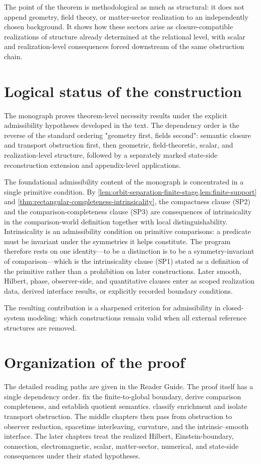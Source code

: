 The point of the theorem is methodological as much as structural:
it does not append geometry, field theory, or matter-sector realization
to an independently chosen background.
It shows how these sectors arise as closure-compatible realizations of
structure already determined at the relational level, with scalar and
realization-level consequences forced downstream of the same
obstruction chain.

\section{Logical status of the construction}
The monograph proves theorem-level necessity results under the
explicit admissibility hypotheses developed in the text.
The dependency order is the reverse of the standard ordering
"geometry first, fields second":
semantic closure and transport obstruction first, then geometric,
field-theoretic, scalar, and realization-level structure, followed by a
separately marked state-side reconstruction extension and appendix-level
applications.

The foundational admissibility content of the monograph is concentrated
in a single primitive condition. By
\cref{lem:orbit-separation-finite-stage,lem:finite-support} and
\cref{thm:rectangular-completeness-intrinsicality}, the compactness
clause \textup{(SP2)} and the comparison-completeness clause
\textup{(SP3)} are consequences of intrinsicality
in the comparison-world definition together with local distinguishability.
Intrinsicality is an admissibility condition on primitive comparisons:
a predicate must be
invariant under the symmetries it helps constitute. The program therefore
rests on one identity---to be a distinction is to be a
symmetry-invariant of comparison---which is the intrinsicality clause
\textup{(SP1)} stated as a definition of the primitive rather than a
prohibition on later constructions. Later smooth, Hilbert, phase,
observer-side, and quantitative clauses enter as scoped realization data,
derived interface results, or explicitly recorded boundary conditions.

The resulting contribution is a sharpened criterion for admissibility in
closed-system modeling:
which constructions remain valid when all external reference structures
are removed.

\section{Organization of the proof}
\label{sec:paper}
The detailed reading paths are given in the Reader Guide.  The proof
itself has a single dependency order.
 fix the
finite-to-global boundary, derive comparison completeness, and establish
quotient semantics.  
classify enrichment and isolate transport obstruction.  The middle
chapters then pass from obstruction to observer reduction, spacetime
interleaving, curvature, and the intrinsic--smooth interface.  The later
chapters treat the realized Hilbert, Einstein-boundary, connection,
electromagnetic, scalar, matter-sector, numerical, and state-side
consequences under their stated hypotheses.

